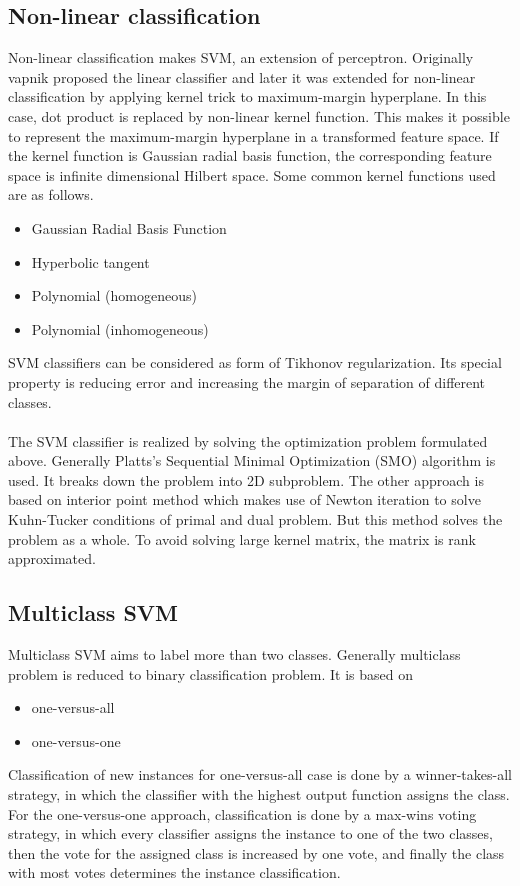 \subsection{Non-linear classification}
 Non-linear classification makes SVM, an extension of perceptron. Originally vapnik proposed the linear
 classifier and later it was extended for non-linear classification by applying kernel trick to  maximum-margin
 hyperplane. In this case, dot product is replaced by non-linear kernel function. This makes it possible
 to represent the maximum-margin hyperplane in a transformed feature space. If the kernel function 
 is Gaussian radial basis function, the corresponding feature space is infinite dimensional Hilbert space. Some common kernel functions used are as follows.
        \begin{itemize}
\item Gaussian Radial Basis Function
\item Hyperbolic tangent
\item Polynomial (homogeneous)
\item Polynomial (inhomogeneous)
        \end{itemize}
	SVM classifiers can be considered as form of Tikhonov regularization. Its special property 
	is reducing error and increasing the margin of separation of different classes.
	
	\paragraph{}
The SVM classifier is realized by solving the optimization problem formulated above. Generally Platts's
Sequential Minimal Optimization (SMO) algorithm is used. It breaks down the problem into 2D 
subproblem. The other approach is based on interior point method which makes use of Newton iteration 
to solve Kuhn-Tucker conditions of primal and dual problem. But this method solves the problem as 
a whole. To avoid solving large kernel matrix, the matrix is rank approximated. 
\subsection{Multiclass SVM}
Multiclass SVM aims to label more than two classes. Generally multiclass problem is reduced to binary 
classification problem. It is based on 
\begin{itemize}
\item one-versus-all
\item one-versus-one
\end{itemize}
Classification of new instances for one-versus-all case is done by a winner-takes-all strategy, in which the classifier with the highest output function assigns the class. For the one-versus-one approach, classification is done by a max-wins voting strategy, in which every classifier assigns the instance to one of the two classes, then the vote for the assigned class is increased by one vote, and finally the class with most votes determines the instance classification.
